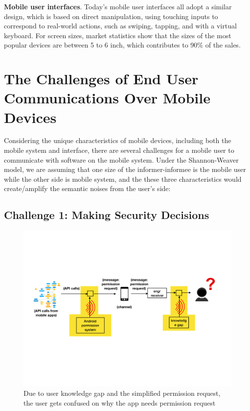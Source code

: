 \textbf{Mobile user interfaces}. Today's mobile user interfaces all adopt a similar design, which is based on direct manipulation, using touching inputs to correspond to real-world actions, such as swiping, tapping, and with a virtual keyboard. For screen sizes, market statistics show that the sizes of the most popular devices are between 5 to 6 inch, which contributes to 90\% of the sales. 

\section{The Challenges of End User Communications Over Mobile Devices}
\label{sec:ch1:challenge}

Considering the unique characteristics of mobile devices, including both the mobile system and interface, there are several challenges for a mobile user to communicate with software on the mobile system. Under the Shannon-Weaver model, we are assuming that one size of the informer-informee is the mobile user while the other side is mobile system, and the these three characteristics would create/amplify the semantic noises from the user's side:

\subsection{Challenge 1: Making Security Decisions}

\begin{figure}[h]
\centering
\includegraphics[width=.8\linewidth]{figure/chapter1/system_challenge}
\caption{Due to user knowledge gap and the simplified permission request, the user gets confused on why the app needs permission request\label{fig:ch1:system}}
\end{figure}

